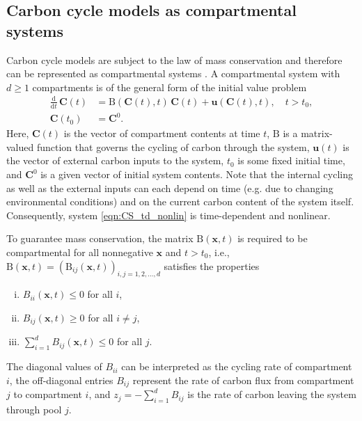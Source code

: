 \documentclass[11pt,a4paper]{article}
\renewcommand{\vec}[1]{\mathbf{#1}}
\newcommand{\tens}[1]{\mathrm{#1}}
\newcommand{\deriv}[1]{\frac{\mathrm{d}}{\mathrm{d}#1}}
\newcommand{\suml}{\sum\limits}
\begin{document}
\subsection{Carbon cycle models as compartmental systems}
    Carbon cycle models are subject to the law of mass conservation and therefore can be represented as compartmental systems \citep{Anderson1983, Jacquez1993}.
    A compartmental system with $d\geq1$ compartments is of the general form of the initial value problem
    \begin{equation}\label{eqn:CS_td_nonlin}
        \begin{aligned}
            \deriv{t}\,\vec{C}(t) &= \tens{B}(\vec{C}(t),t)\,\vec{C}(t) + \vec{u}(\vec{C}(t),t),\quad t>t_0,\\
            \vec{C}(t_0) &= \vec{C}^0.
        \end{aligned}
    \end{equation}
    Here, $\vec{C}(t)$ is the vector of compartment contents at time $t$, $\tens{B}$ is a matrix-valued function that governs the cycling of carbon through the system, $\vec{u}(t)$ is the vector of external carbon inputs to the system, $t_0$ is some fixed initial time, and $\vec{C}^0$ is a given vector  of initial system contents. Note that the internal cycling as well as the external inputs can each depend on time (e.g. due to changing environmental conditions) and on the current carbon content of the system itself. Consequently, system \eqref{eqn:CS_td_nonlin} is time-dependent and nonlinear.
    
    To guarantee mass conservation, the matrix $\tens{B}(\vec{x},t)$ is required to be compartmental 
    for all nonnegative $\vec{x}$ and $t>t_0$, i.e., $\tens{B}(\vec{x},t)=(\tens{B}_{ij}(\vec{x},t))_{i,j=1,2,\ldots,d}$ satisfies the properties
    \begin{enumerate}[(i)]
        \item $B_{ii}(\vec{x},t)\leq0$ for all $i$,
        \item $B_{ij}(\vec{x},t)\geq0$ for all $i\neq j$,
        \item $\suml_{i=1}^d B_{ij}(\vec{x},t)\leq0$ for all $j$.
    \end{enumerate}
    The diagonal values of $B_{ii}$ can be interpreted as the cycling rate of compartment $i$, the off-diagonal entries $B_{ij}$ represent the rate of carbon flux from compartment $j$ to compartment $i$, and $z_j=-\sum_{i=1}^d B_{ij}$ is the rate of carbon leaving the system through pool $j$.
    
\end{document}
